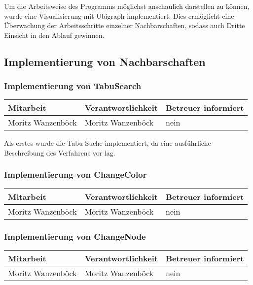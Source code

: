 Um die Arbeitsweise des Programms möglichst anschaulich darstellen zu können, wurde eine Visualisierung mit Ubigraph implementiert. Dies ermöglicht eine Überwachung der Ar\-beits\-schrit\-te einzelner Nachbarschaften, sodass auch Dritte Einsicht in den Ablauf gewinnen.

\subsection{Implementierung von Nachbarschaften}

\subsubsection{ Implementierung von TabuSearch}

\begin{center}
\begin{tabular}{lll}
	Mitarbeit & Verantwortlichkeit & Betreuer informiert \\
	\hline
	Moritz Wanzenböck & Moritz Wanzenböck & nein \\
\end{tabular}
\end{center}

Als erstes wurde die Tabu-Suche implementiert, da eine ausführliche Beschreibung des Verfahrens vor lag. %

\subsubsection{ Implementierung von ChangeColor} %

\begin{center}
\begin{tabular}{lll}
	Mitarbeit & Verantwortlichkeit & Betreuer informiert \\
	\hline
	Moritz Wanzenböck & Moritz Wanzenböck & nein \\
\end{tabular}
\end{center}

\subsubsection{ Implementierung von ChangeNode} %

\begin{center}
\begin{tabular}{lll}
	Mitarbeit & Verantwortlichkeit & Betreuer informiert \\
	\hline
	Moritz Wanzenböck & Moritz Wanzenböck & nein \\
\end{tabular}
\end{center}

